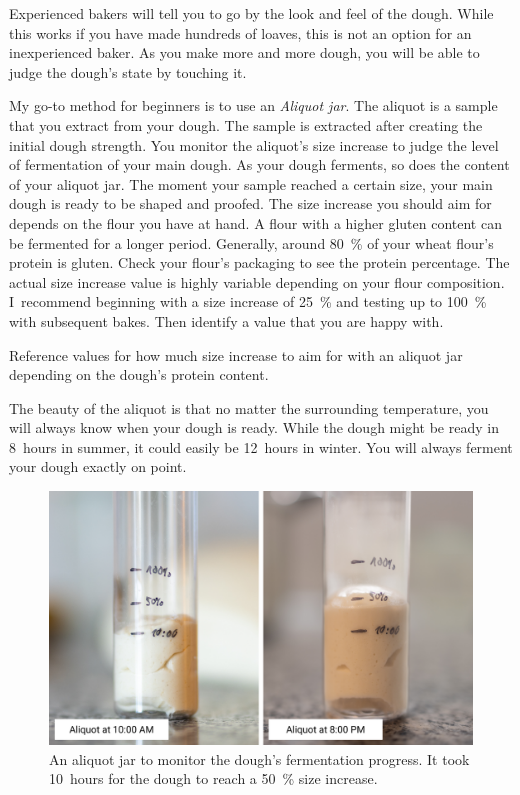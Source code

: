 Experienced bakers will tell you to go by the look and feel of
the dough. While this works if you have made hundreds of loaves,
this is not an option for an inexperienced baker. As
you make more and more dough, you will be able to judge
the dough's state by touching it.

My go-to method for beginners is to use an \emph{Aliquot jar}.
The aliquot is a sample that you extract from your dough. The
sample is extracted after creating the initial dough strength.
You monitor the aliquot's size increase to judge the
level of fermentation of your main dough. As your
dough ferments, so does the content of your aliquot jar. The moment your
sample reached a certain size, your main dough is ready
to be shaped and proofed. The size increase you should
aim for depends on the flour you have at hand. A flour
with a higher gluten content can be fermented for a
longer period. Generally, around \qty{80}{\percent}
of your wheat flour's protein is gluten. Check your flour's
packaging to see the protein percentage. The actual size increase
value is highly variable depending on your flour composition.
I~recommend beginning with a size increase of \qty{25}{\percent} and testing
up to \qty{100}{\percent} with subsequent bakes. Then identify a value
that you are happy with.

\begin{table}[!htb]
    \centering
        
        \caption[Increase of size versus protein content]{Reference values for
            how much size increase to aim for with an aliquot jar depending on
            the dough's protein content.}
\end{table}

The beauty of the aliquot is that no matter the surrounding
temperature, you will always know when your dough is ready.
While the dough might be ready in 8~hours in summer, it could
easily be 12~hours in winter. You will always ferment your
dough exactly on point.


\begin{figure}[!htb]
  \includegraphics[width=\textwidth]{aliquot-before-after}
  \caption[Aliquot Jar]{An aliquot jar to monitor the dough's fermentation
      progress.  It took 10~hours for the dough to reach a \qty{50}{\percent}
      size increase.}
\end{figure}

